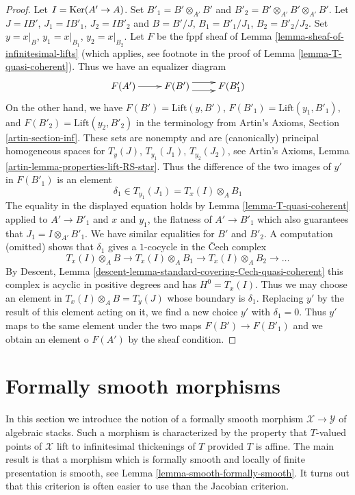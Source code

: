 \begin{proof}
Let $I = \mathop{\mathrm{Ker}}(A' \to A)$. Set $B'_1 = B' \otimes_{A'} B'$ and
$B'_2 = B' \otimes_{A'} B' \otimes_{A'} B'$. Let
$J = IB'$, $J_1 = IB'_1$, $J_2 = IB'_2$ and
$B = B'/J$, $B_1 = B'_1/J_1$, $B_2 = B'_2/J_2$.
Set $y = x|_B$, $y_1 = x|_{B_1}$, $y_2 = x|_{B_2}$.
Let $F$ be the fppf sheaf of
Lemma \ref{lemma-sheaf-of-infinitesimal-lifts}
(which applies, see footnote in the proof of
Lemma \ref{lemma-T-quasi-coherent}).
Thus we have an equalizer diagram
$$
\xymatrix{
F(A') \ar[r] &
F(B') \ar@<1ex>[r] \ar@<-1ex>[r] &
F(B'_1)
}
$$
On the other hand, we have $F(B') = \text{Lift}(y, B')$,
$F(B'_1) = \text{Lift}(y_1, B'_1)$, and $F(B'_2) = \text{Lift}(y_2, B'_2)$
in the terminology from Artin's Axioms, Section \ref{artin-section-inf}.
These sets are nonempty and are (canonically) principal homogeneous spaces for
$T_y(J)$, $T_{y_1}(J_1)$, $T_{y_2}(J_2)$, see
Artin's Axioms, Lemma \ref{artin-lemma-properties-lift-RS-star}.
Thus the difference of the two images of $y'$ in
$F(B'_1)$ is an element
$$
\delta_1 \in T_{y_1}(J_1) = T_x(I) \otimes_A B_1
$$
The equality in the displayed equation holds by
Lemma \ref{lemma-T-quasi-coherent} applied to
$A' \to B'_1$ and $x$ and $y_1$, the flatness of $A' \to B'_1$
which also guarantees that $J_1 = I \otimes_{A'} B'_1$. We have
similar equalities for $B'$ and $B'_2$.
A computation (omitted) shows that $\delta_1$ gives
a $1$-cocycle in the {\v C}ech complex
$$
T_x(I) \otimes_A B \to
T_x(I) \otimes_A B_1 \to
T_x(I) \otimes_A B_2 \to \ldots
$$
By Descent, Lemma \ref{descent-lemma-standard-covering-Cech-quasi-coherent}
this complex is acyclic in positive degrees and has $H^0 = T_x(I)$.
Thus we may choose an element in $T_x(I) \otimes_A B = T_y(J)$
whose boundary is $\delta_1$. Replacing $y'$ by the result
of this element acting on it, we find a new choice $y'$ with $\delta_1 = 0$.
Thus $y'$ maps to the same element under the two maps
$F(B') \to F(B'_1)$ and we obtain an element o $F(A')$ by
the sheaf condition.
\end{proof}












\section{Formally smooth morphisms}
\label{section-formally-smooth}

\noindent
In this section we introduce the notion of a formally smooth morphism
$\mathcal{X} \to \mathcal{Y}$ of algebraic stacks. Such a morphism is
characterized by the property that $T$-valued points of $\mathcal{X}$ lift
to infinitesimal thickenings of $T$ provided $T$ is affine.
The main result is that a morphism which is formally smooth and
locally of finite presentation is smooth, see
Lemma \ref{lemma-smooth-formally-smooth}.
It turns out that this criterion is often easier to use than the
Jacobian criterion.

